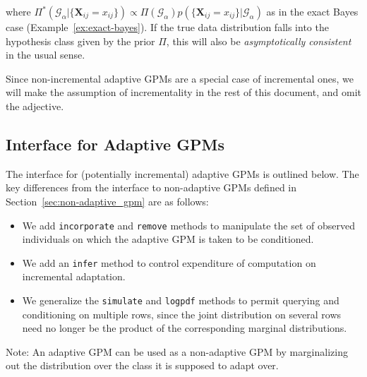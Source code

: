 \documentclass[10pt,letterpaper]{article}
\newcommand{\set}[1]{\{#1\}}
\newcommand{\G}{\mathcal{G}}
\begin{document}
where $\Pi^*(\G_\alpha|\set{\mathbf{X}_{ij}=x_{ij}}) \propto 
\Pi(\G_\alpha) p(\set{\mathbf{X}_{ij}=x_{ij}}|\G_\alpha)$
as in the exact Bayes case (Example~\ref{ex:exact-bayes}).
If the true data distribution falls into the hypothesis class given by
the prior $\Pi$, this will also be \emph{asymptotically consistent} in
the usual sense.

Since non-incremental adaptive GPMs are a special case of incremental
ones, we will make the assumption of incrementality in the rest of
this document, and omit the adjective.

\subsection{Interface for Adaptive GPMs}
\label{sec:adaptive_gpm}

The interface for (potentially incremental) adaptive GPMs is outlined
below.  The key differences from the interface to non-adaptive GPMs
defined in Section~\ref{sec:non-adaptive_gpm} are as follows:

\begin{itemize}
\item We add \texttt{incorporate} and \texttt{remove} methods to
  manipulate the set of observed individuals on which the adaptive GPM
  is taken to be conditioned.
\item We add an \texttt{infer} method to control expenditure of
  computation on incremental adaptation.
\item We generalize the \texttt{simulate} and \texttt{logpdf} methods
  to permit querying and conditioning on multiple rows, since the
  joint distribution on several rows need no longer be the product of
  the corresponding marginal distributions.
\end{itemize}

Note: An adaptive GPM can be used as a non-adaptive GPM by
marginalizing out the distribution over the class it is supposed to
adapt over.
\end{document}
